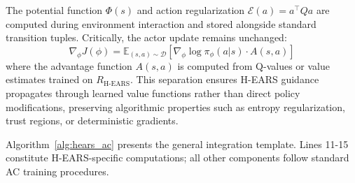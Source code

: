 \documentclass[journal]{IEEEtran}
\begin{document}
	The potential function $\Phi(s)$ and action regularization $\mathcal{E}(a) = a^\top Q a$ are computed during environment interaction and stored alongside standard transition tuples. Critically, the actor update remains unchanged:
	\begin{equation}
		\nabla_\phi J(\phi) = \mathbb{E}_{(s,a) \sim \mathcal{D}}\left[\nabla_\phi \log \pi_\phi(a|s) \cdot A(s,a)\right]
		\label{eq:actor_gradient}
	\end{equation}
	where the advantage function $A(s,a)$ is computed from Q-values or value estimates trained on $R_{\text{H-EARS}}$. This separation ensures H-EARS guidance propagates through learned value functions rather than direct policy modifications, preserving algorithmic properties such as entropy regularization, trust regions, or deterministic gradients. 
	
	Algorithm~\ref{alg:hears_ac} presents the general integration template. Lines 11-15 constitute H-EARS-specific computations; all other components follow standard AC training procedures.
	
\end{document}
